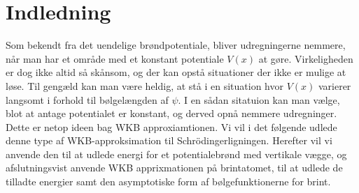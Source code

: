\section{Indledning}


Som bekendt fra det uendelige brøndpotentiale, bliver udregningerne nemmere, når man har et område med et konstant potentiale $V(x)$ at gøre. Virkeligheden er dog ikke altid så skånsom, og der kan opstå situationer der ikke er mulige at løse. Til gengæld kan man være heldig, at stå i en situation hvor $V(x)$ varierer langsomt i forhold til bølgelængden af $\psi$. I en sådan sitatuion kan man vælge, blot at antage potentialet er konstant, og derved opnå nemmere udregninger. Dette er netop ideen bag WKB approxiamtionen.
Vi vil i det følgende udlede denne type af WKB-approksimation til Schrödingerligningen. Herefter vil vi anvende den til at udlede energi for et potentialebrønd med vertikale vægge, og afslutningsvist anvende WKB apprixmationen på brintatomet, til at udlede de tilladte energier samt den asymptotiske form af bølgefunktionerne for brint.
